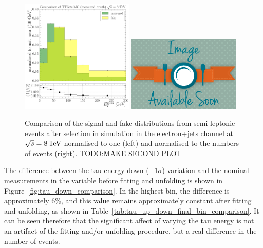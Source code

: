 \begin{figure}[hbtp]
    \centering
     \includegraphics[width=0.48\textwidth]{Chapters/04_Analysis/04b_XSections/images/tau_cross_checks/comparison_measured_fakeTTJets_normalised_to_one.pdf}\hfill
     \includegraphics[width=0.48\textwidth]{Chapters/04_Analysis/04b_XSections/images/placeholder.png}
\caption{Comparison of the signal and fake distributions from semi-leptonic \ttbar events after
     selection in simulation in the electron+jets channel at $\sqrt{s}=8\,\text{Te\hspace{-.08em}V}$ normalised to one (left) and
     normalised to the numbers of events (right). TODO:MAKE SECOND PLOT} %
     \label{fig:tau_shape_number_comparison}
\end{figure}

The difference between the tau energy down ($-1\sigma$) variation and the nominal measurements in the \met
variable before fitting and unfolding is shown in Figure~\ref{fig:tau_down_comparison}. In the highest \met
bin, the difference is approximately 6\%, and this value remains approximately constant after fitting and
unfolding, as shown in Table~\ref{tab:tau_up_down_final_bin_comparison}. It can be seen therefore that the
significant affect of varying the tau energy is not an artifact of the fitting and/or unfolding procedure, but
a real difference in the number of events.

